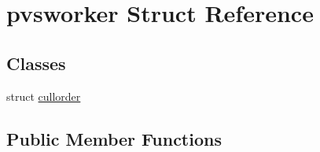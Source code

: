\hypertarget{structpvsworker}{}\section{pvsworker Struct Reference}
\label{structpvsworker}
\subsection*{Classes}
\begin{DoxyCompactItemize}
\item 
struct \hyperlink{structpvsworker_1_1cullorder}{cullorder}
\end{DoxyCompactItemize}
\subsection*{Public Member Functions}
